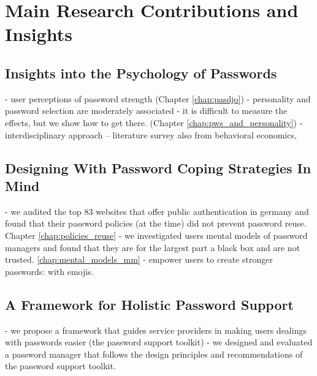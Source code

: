 \section{Main Research Contributions and Insights}\label{sec:intro:contributions}

\subsection{Insights into the Psychology of Passwords}
- user perceptions of password strength (Chapter \ref{chap:pasdjo})
- personality and password selection are moderately associated
- it is difficult to measure the effects, but we show how to get there. (Chapter \ref{chap:pws_and_personality})
- interdisciplinary approach -- literature survey also from behavioral economics, 

\subsection{Designing With Password Coping Strategies In Mind}
- we audited the top 83 websites that offer public authentication in germany and found that their password policies (at the time) did not prevent password reuse. Chapter \ref{chap:policies_reuse}
- we investigated users mental models of password managers and found that they are for the largest part a black box and are not trusted. \ref{chap:mental_models_mm}
- empower users to create stronger passwords: with emojis. 


\subsection{A Framework for Holistic Password Support}
- we propose a framework that guides service providers in making users dealings with passwords easier (the password support toolkit)
- we designed and evaluated a password manager that follows the design principles and recommendations of the password support toolkit. 


